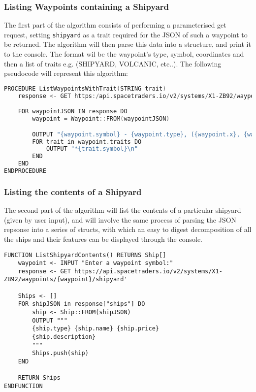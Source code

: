 \subsubsection{Listing Waypoints containing a Shipyard}
The first part of the algorithm consists of performing a parameterised get request, setting \texttt{shipyard} as a trait required for the JSON of such a waypoint to be returned. The algorithm will then parse this data into a structure, and print it to the console. The format wil be the waypoint's type, symbol, coordinates and then a list of traits e.g. (SHIPYARD, VOLCANIC, etc..). The following pseudocode will represent this algorithm:
\begin{lstlisting}[language=C]
PROCEDURE ListWaypointsWithTrait(STRING trait)
    response <- GET https:/api.spacetraders.io/v2/systems/X1-ZB92/waypoints?traits={trait}

    FOR waypointJSON IN response DO 
        waypoint = Waypoint::FROM(waypointJSON)

        OUTPUT "{waypoint.symbol} - {waypoint.type}, ({waypoint.x}, {waypoint.y}):" 
        FOR trait in waypoint.traits DO
            OUTPUT "*{trait.symbol}\n"
        END
    END
ENDPROCEDURE
\end{lstlisting}
\subsubsection{Listing the contents of a Shipyard}
The second part of the algorithm will list the contents of a particular shipyard (given by user input), and will involve the same process of parsing the JSON repsonse into a series of structs, with which an easy to digest decomposition of all the ships and their features can be displayed through the console.
\begin{lstlisting}
FUNCTION ListShipyardContents() RETURNS Ship[]
    waypoint <- INPUT "Enter a waypoint symbol:"
    response <- GET https://api.spacetraders.io/v2/systems/X1-ZB92/waypoints/{waypoint}/shipyard'

    Ships <- []
    FOR shipJSON in response["ships"] DO 
        ship <- Ship::FROM(shipJSON)
        OUTPUT """
        {ship.type} {ship.name} {ship.price}
        {ship.description}
        """
        Ships.push(ship)
    END

    RETURN Ships
ENDFUNCTION
\end{lstlisting}
